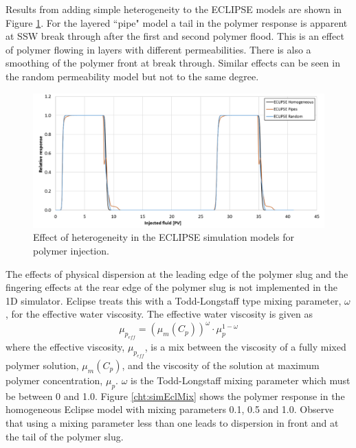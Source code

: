 \documentclass[journal = enfuem, manuscript =  article]{achemso}
\begin{document}
\FloatBarrier

Results from adding simple heterogeneity to the ECLIPSE models are shown in Figure \ref{cht:simEclHet}. For the layered ``pipe" model a tail in the polymer response is apparent at SSW break through after the first and second polymer flood. This is an effect of polymer flowing in layers with different permeabilities. There is also a smoothing of the polymer front at break through. Similar effects can be seen in the random permeability model but not to the same degree.    

\begin{figure}
    \centering
    \includegraphics[width=\textwidth]{fig/simEclHet.png}
    \caption{Effect of heterogeneity in the ECLIPSE simulation models for polymer injection.}
    \label{cht:simEclHet}
\end{figure}

The effects of physical dispersion at the leading edge of the polymer slug and the fingering effects at the rear edge of the polymer slug is not implemented in the 1D simulator. Eclipse treats this with a Todd-Longstaff type mixing parameter,  $\omega$, for the effective water viscosity. The effective water viscosity is given as
\begin{equation}
    \mu_{p_\textit{eff}} = (\mu_m(C_p))^\omega \cdot \mu_p^{1-\omega}
\end{equation}
where the effective viscosity,  $\mu_{p_\textit{eff}}$, is a mix between the viscosity of a fully mixed polymer solution,  $\mu_m(C_p)$, and the viscosity of the solution at maximum polymer concentration,  $\mu_p$.  $\omega$ is the Todd-Longstaff mixing parameter which must be between 0 and 1.0. Figure \ref{cht:simEclMix} shows the polymer response in the homogeneous Eclipse model with mixing parameters 0.1, 0.5 and 1.0. Observe that using a mixing parameter less than one leads to dispersion in front and at the tail of the polymer slug.
\end{document}
